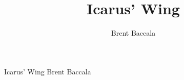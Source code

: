 \documentclass{book}
\begin{document}
\parindent 0pt
\parskip 12pt

\fontsize{12pt}{14pt}
\selectfont

\title{Icarus' Wing}
\author{Brent Baccala}
\date{}


\frontmatter

\begin{center}
{\Huge Icarus' Wing}
\vskip 0.5in {\Large Brent Baccala}
\end{center}

\mainmatter
\end{document}
